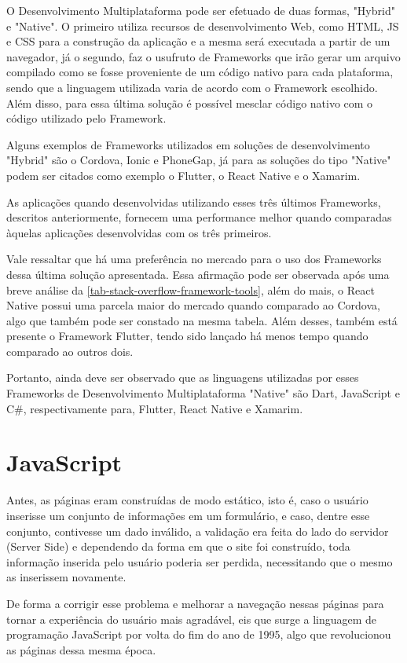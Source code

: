 O Desenvolvimento Multiplataforma pode ser efetuado de duas formas, "Hybrid" e "Native". O primeiro utiliza recursos de desenvolvimento Web, como HTML, JS e CSS para a construção da aplicação e a mesma será executada a partir de um navegador, já o segundo, faz o usufruto de Frameworks que irão gerar um arquivo compilado como se fosse proveniente de um código nativo para cada plataforma, sendo que a linguagem utilizada varia de acordo com o Framework escolhido. Além disso, para essa última solução é possível mesclar código nativo com o código utilizado pelo Framework.

Alguns exemplos de Frameworks utilizados em soluções de desenvolvimento "Hybrid" são o Cordova, Ionic e PhoneGap, já para as soluções do tipo "Native" podem ser citados como exemplo o Flutter, o React Native e o Xamarim.

As aplicações quando desenvolvidas utilizando esses três últimos Frameworks, descritos anteriormente, fornecem uma performance melhor quando comparadas àquelas aplicações desenvolvidas com os três primeiros.

Vale ressaltar que há uma preferência no mercado para o uso dos Frameworks dessa última solução apresentada. Essa afirmação pode ser observada após uma breve análise da \autoref{tab-stack-overflow-framework-tools}, além do mais, o React Native possui uma parcela maior do mercado quando comparado ao Cordova, algo que também pode ser constado na mesma tabela. Além desses, também está presente o Framework Flutter, tendo sido lançado há menos tempo quando comparado ao outros dois.

Portanto, ainda deve ser observado que as linguagens utilizadas por esses Frameworks de Desenvolvimento Multiplataforma "Native" são Dart, JavaScript e C\#, respectivamente para, Flutter, React Native e Xamarim.

\section{JavaScript}\label{JavaScript}

Antes, as páginas eram construídas de modo estático, isto é, caso o usuário inserisse um conjunto de informações em um formulário, e caso, dentre esse conjunto, contivesse um dado inválido, a validação era feita do lado do servidor (Server Side) e dependendo da forma em que o site foi construído, toda informação inserida pelo usuário poderia ser perdida, necessitando que o mesmo as inserissem novamente.

De forma a corrigir esse problema e melhorar a navegação nessas páginas para tornar a experiência do usuário mais agradável, eis que surge a linguagem de programação JavaScript por volta do fim do ano de 1995, algo que revolucionou as páginas dessa mesma época.

